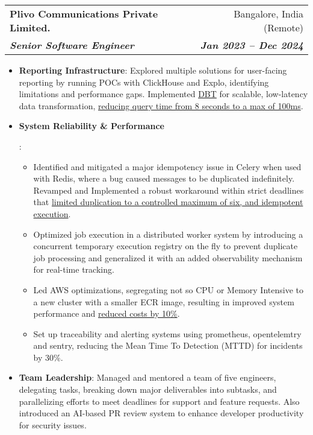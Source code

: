 \documentclass[letterpaper,11pt]{article}
\makeatletter
\newcommand{\resumeItem}[2]{
  \item\small{
    \textbf{#1}{: #2 \vspace{-2pt}}
  }
}
\newcommand{\resumeSubheading}[4]{
  \vspace{-1pt}\item
    \begin{tabular*}{0.97\textwidth}[t]{l@{\extracolsep{\fill}}r}
      \textbf{#1} & #2 \\
      \textbf{\textit{\small\color{rolecolor}#3}} & \textbf{\textit{\small #4}} \\
    \end{tabular*}\vspace{-5pt}
}
\newcommand{\resumeItemListStart}{\begin{itemize}}
\newcommand{\resumeItemListEnd}{\end{itemize}\vspace{-5pt}}
\makeatother
\begin{document}
    \resumeSubheading
      {Plivo Communications Private Limited.}{Bangalore, India (Remote)}
      {Senior Software Engineer}{Jan 2023 -- Dec 2024}
      \resumeItemListStart
        \resumeItem{Reporting Infrastructure}
          {Explored multiple solutions for user-facing reporting by running POCs with ClickHouse and Explo, identifying limitations and performance gaps. Implemented \underline{DBT} for scalable, low-latency data transformation, \underline{reducing query time from 8 seconds to a max of 100ms}.}
        \resumeItem{System Reliability \& Performance}{
          \begin{itemize}[label=$\circ$]
            \item Identified and mitigated a major idempotency issue in Celery when used with Redis, where a bug caused messages to be duplicated indefinitely. Revamped and Implemented a robust workaround within strict deadlines that \underline{limited duplication to a controlled maximum of six, and idempotent execution}.
            \item Optimized job execution in a distributed worker system by introducing a concurrent temporary execution registry on the fly to prevent duplicate job processing and generalized it with an added observability mechanism for real-time tracking.
            \item Led AWS optimizations, segregating not so CPU or Memory Intensive to a new cluster with a smaller ECR image, resulting in improved system performance and \underline{reduced costs by 10\%}.
            \item Set up traceability and alerting systems using prometheus, opentelemtry and sentry, reducing the Mean Time To Detection (MTTD) for incidents by 30\%.
          \end{itemize}
        }
        \resumeItem{Team Leadership}
          {Managed and mentored a team of five engineers, delegating tasks, breaking down major deliverables into subtasks, and parallelizing efforts to meet deadlines for support and feature requests. Also introduced an AI-based PR review system to enhance developer productivity for security issues.}
      \resumeItemListEnd
\end{document}
